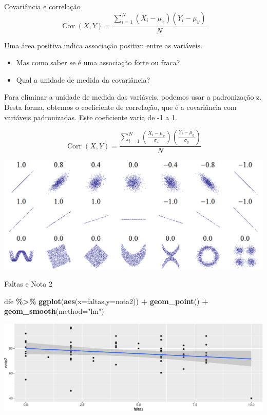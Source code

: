 \documentclass[
  9pt,
  ignorenonframetext,
  aspectratio=169]{beamer}
\newenvironment{Shaded}{\begin{snugshade}}{\end{snugshade}}
\newcommand{\DataTypeTok}[1]{\textcolor[rgb]{0.13,0.29,0.53}{#1}}
\newcommand{\KeywordTok}[1]{\textcolor[rgb]{0.13,0.29,0.53}{\textbf{#1}}}
\newcommand{\NormalTok}[1]{#1}
\newcommand{\OperatorTok}[1]{\textcolor[rgb]{0.81,0.36,0.00}{\textbf{#1}}}
\newcommand{\StringTok}[1]{\textcolor[rgb]{0.31,0.60,0.02}{#1}}
\begin{document}
\begin{frame}{Covariância e correlação}
\protect\hypertarget{covariuxe2ncia-e-correlauxe7uxe3o}{}
\[
\operatorname{Cov}(X, Y)=\frac{\sum_{i=1}^{N}\left(X_{i}-\mu_{x}\right)\left(Y_{i}-\mu_{y}\right)}{N}
\]

Uma área positiva indica associação positiva entre as variáveis.

\begin{itemize}
\item
  Mas como saber se é uma associação forte ou fraca?
\item
  Qual a unidade de medida da covariância?
\end{itemize}

Para eliminar a unidade de medida das variáveis, podemos usar a
padronização z. Desta forma, obtemos o coeficiente de correlação, que é
a covariância com variáveis padronizadas. Este coeficiente varia de -1 a
1.

\[
\operatorname{Corr}(X, Y)=\frac{\sum_{i=1}^{N}\left(\frac{X_{i}-\mu_{x}}{\sigma_{x}}\right)\left(\frac{Y_{i}-\mu_{y}}{\sigma_{y}}\right)}{N}
\]
\end{frame}

\begin{frame}{}
\protect\hypertarget{section-4}{}
\includegraphics{imgs/correlacao.png}
\end{frame}

\begin{frame}[fragile]{Faltas e Nota 2}
\protect\hypertarget{faltas-e-nota-2}{}
\begin{Shaded}
\begin{Highlighting}[]
\NormalTok{dfe }\OperatorTok{\%\textgreater{}\%}\StringTok{ }\KeywordTok{ggplot}\NormalTok{(}\KeywordTok{aes}\NormalTok{(}\DataTypeTok{x=}\NormalTok{faltas,}\DataTypeTok{y=}\NormalTok{nota2)) }\OperatorTok{+}
\StringTok{  }\KeywordTok{geom\_point}\NormalTok{() }\OperatorTok{+}\StringTok{ }\KeywordTok{geom\_smooth}\NormalTok{(}\DataTypeTok{method=}\StringTok{"lm"}\NormalTok{)}
\end{Highlighting}
\end{Shaded}

\includegraphics{aula_11_files/figure-beamer/unnamed-chunk-32-1.pdf}
\end{frame}
\end{document}
